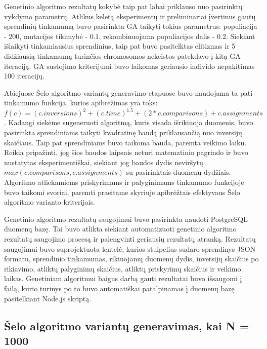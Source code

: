 \documentclass{VUMIFInfKursinis}
\begin{document}
Genetinio algoritmo rezultatų kokybė taip pat labai priklauso nuo pasirinktų vykdymo parametrų.
Atlikus keletą eksperimentų ir preliminariai įvertinus gautų sprendinių tinkamumą buvo pasirinkta GA taikyti tokius parametrus:
populiacija - $200$, mutacijos tikimybė - $0.1$, rekombinuojama populiacijos dalis - $0.2$.
Siekiant išlaikyti tinkamiausius sprendinius, taip pat buvo pasitelktas elitizmas ir 5 didžiausią tinkamumą turinčios chromosomos nekeistos patekdavo į kitą GA iteraciją.
GA sustojimo kriterijumi buvo laikomas geriausio individo nepakitimas 100 iteracijų.

Abiejuose Šelo algoritmo variantų generavimo etapuose buvo naudojama ta pati tinkamumo funkcija, kurios apibrėžimas yra toks:
\\${f(c) = (c.inversions)^2 + (c.time)^{1.5} + (2*c.comparisons) + c.assignments}$.
Kadangi siekėme sugeneruoti algoritmą, kuris visada išrikiuoja duomenis, buvo pasirinkta sprendiniams taikyti kvadratinę baudą priklausančią nuo inversijų skaičiaus.
Taip pat sprendiniams buvo taikoma bauda, paremta veikimo laiku. Reikia pripažinti, jog šios baudos laipsnis neturi matematinio pagrindo ir buvo nustatytas eksperimentiškai,
siekiant jog baudos dydis neviršytų ${max(c.comparisons, c.assignments)}$ su pasirinktais duomenų dydžiais.
Algoritmo atliekamiems priskyrimams ir palyginimams tinkamumo funkcijoje buvo taikomi svoriai, paremti
praeitame skyriuje apibrėžtais efektyvaus Šelo algoritmo varianto kriterijais. 

Genetinio algoritmo rezultatų saugojimui buvo pasirinkta naudoti PostgreSQL duomenų bazę.
Tai buvo atlikta siekiant automatizuoti genetinio algoritmo rezultatų saugojimo procesą ir palengvinti geriausių rezultatų atranką.
Rezultatų saugojimui buvo suprojektuota lentelė, kurios stulpelius sudaro sprendinys JSON formatu, sprendinio tinkamumas, rikiuojamų duomenų dydis,
inversijų skaičius po rikiavimo, atliktų palyginimų skaičius, atliktų priskyrimų skaičius ir veikimo laikas.  
Genetiniam algoritmui baigus darbą gauti rezultatai buvo išsaugomi į failą, kurio turinys po to buvo automatiškai patalpinamas į duomenų bazę pasitelkiant Node.js skriptą.

\subsection{Šelo algoritmo variantų generavimas, kai N = 1000}
\end{document}
